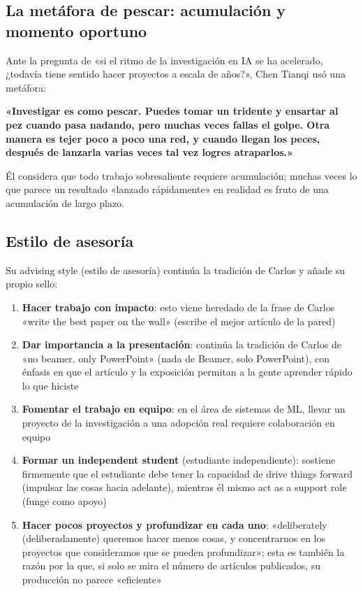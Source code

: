 \subsection{La metáfora de pescar: acumulación y momento oportuno}

Ante la pregunta de «si el ritmo de la investigación en IA se ha acelerado, ¿todavía tiene sentido hacer proyectos a escala de años?», Chen Tianqi usó una metáfora:

\textbf{«Investigar es como pescar. Puedes tomar un tridente y ensartar al pez cuando pasa nadando, pero muchas veces fallas el golpe. Otra manera es tejer poco a poco una red, y cuando llegan los peces, después de lanzarla varias veces tal vez logres atraparlos.»}

Él considera que todo trabajo sobresaliente requiere acumulación; muchas veces lo que parece un resultado «lanzado rápidamente» en realidad es fruto de una acumulación de largo plazo.

\subsection{Estilo de asesoría}

Su advising style (estilo de asesoría) continúa la tradición de Carlos y añade su propio sello:

\begin{enumerate}
    \item \textbf{Hacer trabajo con impacto}: esto viene heredado de la frase de Carlos «write the best paper on the wall» (escribe el mejor artículo de la pared)
    \item \textbf{Dar importancia a la presentación}: continúa la tradición de Carlos de «no beamer, only PowerPoint» (nada de Beamer, solo PowerPoint), con énfasis en que el artículo y la exposición permitan a la gente aprender rápido lo que hiciste
    \item \textbf{Fomentar el trabajo en equipo}: en el área de sistemas de ML, llevar un proyecto de la investigación a una adopción real requiere colaboración en equipo
    \item \textbf{Formar un independent student} (estudiante independiente): sostiene firmemente que el estudiante debe tener la capacidad de drive things forward (impulsar las cosas hacia adelante), mientras él mismo act as a support role (funge como apoyo)
    \item \textbf{Hacer pocos proyectos y profundizar en cada uno}: «deliberately (deliberadamente) queremos hacer menos cosas, y concentrarnos en los proyectos que consideramos que se pueden profundizar»; esta es también la razón por la que, si solo se mira el número de artículos publicados, su producción no parece «eficiente»
\end{enumerate}

